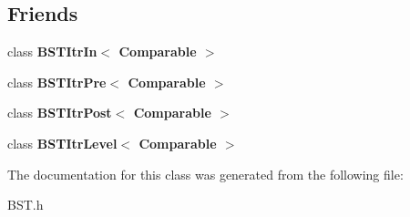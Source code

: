 \subsection*{Friends}
\begin{DoxyCompactItemize}
\item 
\mbox{\label{class_b_s_t_aab3993acac2ab24a0b59edb0c3acc775}} 
class {\bfseries B\+S\+T\+Itr\+In$<$ Comparable $>$}
\item 
\mbox{\label{class_b_s_t_a45a55df6f11541416d4ea7684c575c1a}} 
class {\bfseries B\+S\+T\+Itr\+Pre$<$ Comparable $>$}
\item 
\mbox{\label{class_b_s_t_a5dc153694be266f6e772659486219da7}} 
class {\bfseries B\+S\+T\+Itr\+Post$<$ Comparable $>$}
\item 
\mbox{\label{class_b_s_t_a26ff00bc0d87069aed877f10fd3c80a8}} 
class {\bfseries B\+S\+T\+Itr\+Level$<$ Comparable $>$}
\end{DoxyCompactItemize}


The documentation for this class was generated from the following file\+:\begin{DoxyCompactItemize}
\item 
B\+S\+T.\+h\end{DoxyCompactItemize}
